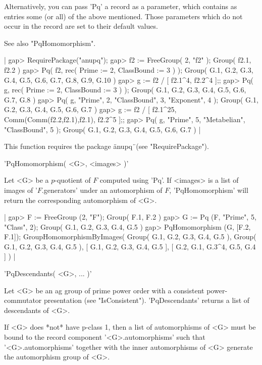 Alternatively, you can pass 'Pq' a record as a parameter, which  contains
as entries some (or all)  of the above mentioned.  Those parameters which
do not occur in the record are set to their default values.

See also "PqHomomorphism".

|    gap> RequirePackage("anupq");
    gap> f2 := FreeGroup( 2, "f2" );
    Group( f2.1, f2.2 )
    gap> Pq( f2, rec( Prime := 2,  ClassBound := 3 ) );
    Group( G.1, G.2, G.3, G.4, G.5, G.6, G.7, G.8, G.9, G.10 )
    gap> g := f2 / [ f2.1^4, f2.2^4 ];;
    gap> Pq( g, rec( Prime := 2, ClassBound := 3 ) );
    Group( G.1, G.2, G.3, G.4, G.5, G.6, G.7, G.8 )
    gap> Pq( g, "Prime", 2, "ClassBound", 3, "Exponent", 4 );
    Group( G.1, G.2, G.3, G.4, G.5, G.6, G.7 )
    gap> g := f2 / [ f2.1^25, Comm(Comm(f2.2,f2.1),f2.1), f2.2^5 ];;
    gap> Pq( g, "Prime", 5, "Metabelian", "ClassBound", 5 );
    Group( G.1, G.2, G.3, G.4, G.5, G.6, G.7 ) |

This function requires the package \"anupq\"\ (see "RequirePackage").


'PqHomomorphism( <G>, <images> )'

Let <G> be a $p$-quotient of $F$ computed  using  'Pq'. If <images>  is a
list  of  images  of  '$F$.generators'  under  an  automorphism  of  $F$,
'PqHomomorphism' will return the corresponding automorphism of <G>.

|    gap> F := FreeGroup (2, "F");
    Group( F.1, F.2 )
    gap> G := Pq (F, "Prime", 5, "Class", 2);
    Group( G.1, G.2, G.3, G.4, G.5 )
    gap> PqHomomorphism (G, [F.2, F.1]);
    GroupHomomorphismByImages( Group( G.1, G.2, G.3, G.4, G.5 ), Group(
    G.1, G.2, G.3, G.4, G.5 ), [ G.1, G.2, G.3, G.4, G.5 ],
    [ G.2, G.1, G.3^4, G.5, G.4 ] ) |


'PqDescendants( <G>, ... )'

Let  <G>  be  an  ag  group  of  prime  power  order  with  a  consistent
power-commutator  presentation   (see  "IsConsistent").   'PqDescendants'
returns a list of descendants of <G>.

If <G>  does  *not* have p-class 1,  then a list of  automorphisms of <G>
must  be  bound  to the  record  component '<G>.automorphisms' such  that
'<G>.automorphisms' together with the inner automorphisms of <G> generate
the automorphism group of <G>.

